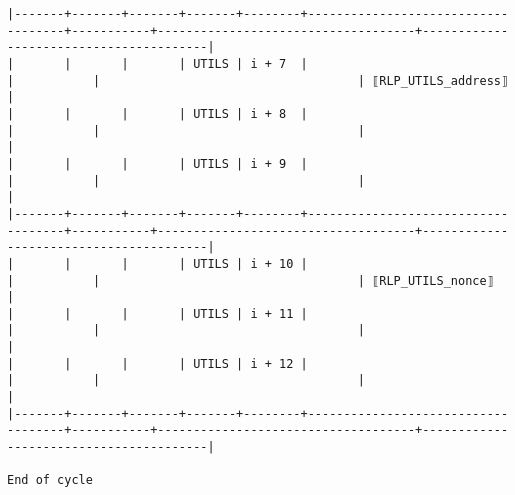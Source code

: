 \documentclass[varwidth=\maxdimen,margin=0.5cm,multi={verbatim}]{standalone}
\begin{document}
\begin{verbatim}
|-------+-------+-------+-------+--------+------------------------------------+-----------+------------------------------------+----------------------------------------|
|       |       |       | UTILS | i + 7  |                                    |           |                                    | ⟦RLP_UTILS_address⟧                    |
|       |       |       | UTILS | i + 8  |                                    |           |                                    |                                        |
|       |       |       | UTILS | i + 9  |                                    |           |                                    |                                        |
|-------+-------+-------+-------+--------+------------------------------------+-----------+------------------------------------+----------------------------------------|
|       |       |       | UTILS | i + 10 |                                    |           |                                    | ⟦RLP_UTILS_nonce⟧                      |
|       |       |       | UTILS | i + 11 |                                    |           |                                    |                                        |
|       |       |       | UTILS | i + 12 |                                    |           |                                    |                                        |
|-------+-------+-------+-------+--------+------------------------------------+-----------+------------------------------------+----------------------------------------|

End of cycle

\end{verbatim}
\end{document}
